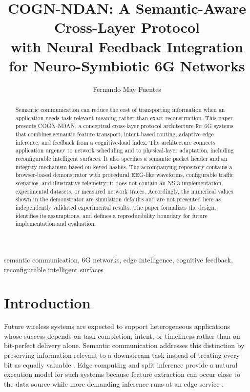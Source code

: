 \documentclass{BVP_CINC}
\begin{document}
\title{COGN-NDAN: A Semantic-Aware Cross-Layer Protocol\\with Neural Feedback Integration\\for Neuro-Symbiotic 6G Networks}

\author{Fernando May Fuentes}

\begin{abstract}
Semantic communication can reduce the cost of transporting information when an application needs task-relevant meaning rather than exact reconstruction. This paper presents COGN-NDAN, a conceptual cross-layer protocol architecture for 6G systems that combines semantic feature transport, intent-based routing, adaptive edge inference, and feedback from a cognitive-load index. The architecture connects application urgency to network scheduling and to physical-layer adaptation, including reconfigurable intelligent surfaces. It also specifies a semantic packet header and an integrity mechanism based on keyed hashes. The accompanying repository contains a browser-based demonstrator with procedural EEG-like waveforms, configurable traffic scenarios, and illustrative telemetry; it does not contain an NS-3 implementation, experimental datasets, or measured network traces. Accordingly, the numerical values shown in the demonstrator are simulation defaults and are not presented here as independently validated experimental results. The paper formalizes the design, identifies its assumptions, and defines a reproducibility boundary for future implementation and evaluation.
\end{abstract}

\begin{keywords}
semantic communication, 6G networks, edge intelligence, cognitive feedback, reconfigurable intelligent surfaces
\end{keywords}

\maketitle

\section{Introduction}
Future wireless systems are expected to support heterogeneous applications whose success depends on task completion, intent, or timeliness rather than on bit-perfect delivery alone. Semantic communication addresses this distinction by preserving information relevant to a downstream task instead of treating every bit as equally valuable \cite{strinati2021,xie2022semantic}. Edge computing and split inference provide a natural execution model for such systems because feature extraction can occur close to the data source while more demanding inference runs at an edge service \cite{bonomi2012fog,wang2020}.
\end{document}
